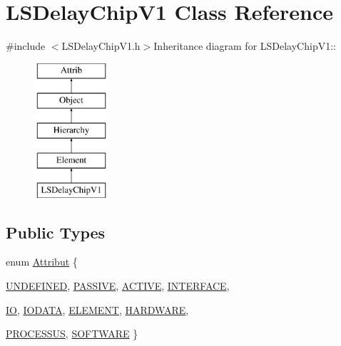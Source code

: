 \hypertarget{classLSDelayChipV1}{
\section{LSDelayChipV1 Class Reference}
\label{classLSDelayChipV1}
}


{\ttfamily \#include $<$LSDelayChipV1.h$>$}Inheritance diagram for LSDelayChipV1::\begin{figure}[H]
\begin{center}
\leavevmode
\includegraphics[height=5cm]{classLSDelayChipV1}
\end{center}
\end{figure}
\subsection*{Public Types}
\begin{DoxyCompactItemize}
\item 
enum \hyperlink{classAttrib_a69e171d7cc6417835a5a306d3c764235}{Attribut} \{ \par
\hyperlink{classAttrib_a69e171d7cc6417835a5a306d3c764235a3a8da2ab97dda18aebab196fe4100531}{UNDEFINED}, 
\hyperlink{classAttrib_a69e171d7cc6417835a5a306d3c764235a2bfb2af57b87031d190a05fe25dd92ed}{PASSIVE}, 
\hyperlink{classAttrib_a69e171d7cc6417835a5a306d3c764235a3b1fec929c0370d1436f2f06e298fb0d}{ACTIVE}, 
\hyperlink{classAttrib_a69e171d7cc6417835a5a306d3c764235aa27c16b480a369ea4d18b07b2516bbc7}{INTERFACE}, 
\par
\hyperlink{classAttrib_a69e171d7cc6417835a5a306d3c764235a1420a5b8c0540b2af210b6975eded7f9}{IO}, 
\hyperlink{classAttrib_a69e171d7cc6417835a5a306d3c764235a0af3b0d0ac323c1704e6c69cf90add28}{IODATA}, 
\hyperlink{classAttrib_a69e171d7cc6417835a5a306d3c764235a7788bc5dd333fd8ce18562b269c9dab1}{ELEMENT}, 
\hyperlink{classAttrib_a69e171d7cc6417835a5a306d3c764235a61ceb22149f365f1780d18f9d1459423}{HARDWARE}, 
\par
\hyperlink{classAttrib_a69e171d7cc6417835a5a306d3c764235a75250e29692496e73effca2c0330977f}{PROCESSUS}, 
\hyperlink{classAttrib_a69e171d7cc6417835a5a306d3c764235a103a67cd0b8f07ef478fa45d4356e27b}{SOFTWARE}
 \}
\end{DoxyCompactItemize}
